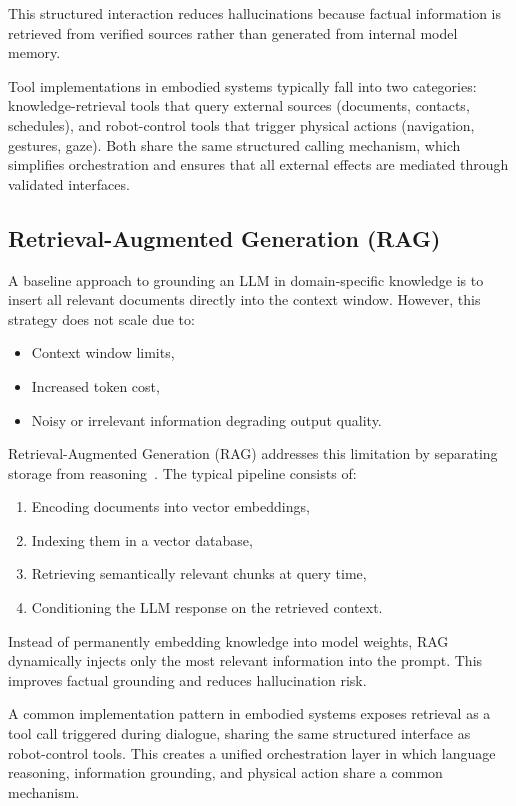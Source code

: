 This structured interaction reduces hallucinations because factual information is retrieved from verified sources rather than generated from internal model memory.

Tool implementations in embodied systems typically fall into two categories: knowledge-retrieval tools that query external sources (documents, contacts, schedules), and robot-control tools that trigger physical actions (navigation, gestures, gaze).
Both share the same structured calling mechanism, which simplifies orchestration and ensures that all external effects are mediated through validated interfaces.


\subsection{Retrieval-Augmented Generation (RAG)}
\label{sec:rag}

A baseline approach to grounding an LLM in domain-specific knowledge is to insert all relevant
documents directly into the context window. However, this strategy does not scale due to:
\begin{itemize}
    \item Context window limits,
    \item Increased token cost,
    \item Noisy or irrelevant information degrading output quality.
\end{itemize}

Retrieval-Augmented Generation (RAG) addresses this limitation by separating storage from reasoning~\cite{lewis2020rag}.
The typical pipeline consists of:

\begin{enumerate}
    \item Encoding documents into vector embeddings,
    \item Indexing them in a vector database,
    \item Retrieving semantically relevant chunks at query time,
    \item Conditioning the LLM response on the retrieved context.
\end{enumerate}

Instead of permanently embedding knowledge into model weights, RAG dynamically injects only the most relevant information into the prompt.
This improves factual grounding and reduces hallucination risk.

A common implementation pattern in embodied systems exposes retrieval as a tool call triggered during dialogue, sharing the same structured interface as robot-control tools.
This creates a unified orchestration layer in which language reasoning, information grounding, and physical action share a common mechanism.


